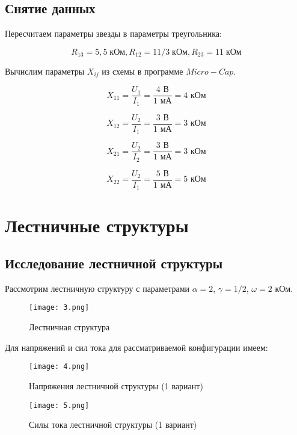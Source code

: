 \documentclass[a4paper, 12pt]{article}%
\begin{document}
\subsection{Снятие данных}

Пересчитаем параметры звезды в параметры треугольника:

$$R_{13} = 5,5 \; \text{кОм}, R_{12} = 11/3 \; \text{кОм}, R_{23} = 11 \; \text{кОм} $$

Вычислим параметры $X_{ij}$ из схемы в программе $Micro-Cap$.

$$ X_{11} = \frac{U_1}{I_1} = \frac{4 \text{ В}}{1 \text{ мА}} = 4 \text{ кОм}$$

$$ X_{12} = \frac{U_2}{I_1} = \frac{3 \text{ В}}{1 \text{ мА}} = 3 \text{ кОм}$$

$$ X_{21} = \frac{U_2}{I_2} = \frac{3 \text{ В}}{1 \text{ мА}} = 3 \text{ кОм}$$

$$ X_{22} = \frac{U_2}{I_1} = \frac{5 \text{ В}}{1 \text{ мА}} = 5 \text{ кОм}$$

\section{Лестничные структуры}

\subsection{Исследование лестничной структуры}

Рассмотрим лестничную структуру с параметрами $\alpha = 2$, $\gamma = 1/2$, $\omega = 2$ кОм.

\begin{figure}[h!]
    \centering
    \texttt{[image: 3.png]}
    \caption{Лестничная структура}
    \label{fig:vac}
\end{figure}

Для напряжений и сил тока для рассматриваемой конфигурации имеем:

\begin{figure}[h!]
    \centering
    \texttt{[image: 4.png]}
    \caption{Напряжения лестничной структуры (1 вариант)}
    \label{fig:vac}
\end{figure}

\begin{figure}[h!]
    \centering
    \texttt{[image: 5.png]}
    \caption{Силы тока лестничной структуры (1 вариант)}
    \label{fig:vac}
\end{figure}
\end{document}
